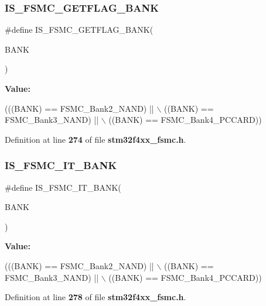 \subsubsection{I\+S\+\_\+\+F\+S\+M\+C\+\_\+\+G\+E\+T\+F\+L\+A\+G\+\_\+\+B\+A\+NK}
{\footnotesize\ttfamily \#define I\+S\+\_\+\+F\+S\+M\+C\+\_\+\+G\+E\+T\+F\+L\+A\+G\+\_\+\+B\+A\+NK(\begin{DoxyParamCaption}\item[{}]{B\+A\+NK }\end{DoxyParamCaption})}

{\bfseries Value\+:}
\begin{DoxyCode}
(((BANK) == FSMC_Bank2_NAND) || \(\backslash\)
                                    ((BANK) == FSMC_Bank3_NAND) || \(\backslash\)
                                    ((BANK) == FSMC_Bank4_PCCARD))
\end{DoxyCode}


Definition at line \textbf{ 274} of file \textbf{ stm32f4xx\+\_\+fsmc.\+h}.

\mbox{\label{group__FSMC__Exported__Constants_gaca216ea0c184b78f23df15296a10bac0}} 
\subsubsection{I\+S\+\_\+\+F\+S\+M\+C\+\_\+\+I\+T\+\_\+\+B\+A\+NK}
{\footnotesize\ttfamily \#define I\+S\+\_\+\+F\+S\+M\+C\+\_\+\+I\+T\+\_\+\+B\+A\+NK(\begin{DoxyParamCaption}\item[{}]{B\+A\+NK }\end{DoxyParamCaption})}

{\bfseries Value\+:}
\begin{DoxyCode}
(((BANK) == FSMC_Bank2_NAND) || \(\backslash\)
                               ((BANK) == FSMC_Bank3_NAND) || \(\backslash\)
                               ((BANK) == FSMC_Bank4_PCCARD))
\end{DoxyCode}


Definition at line \textbf{ 278} of file \textbf{ stm32f4xx\+\_\+fsmc.\+h}.

\mbox{\label{group__FSMC__Exported__Constants_ga725bada099197f15f49dc0c5be00e19b}} 
